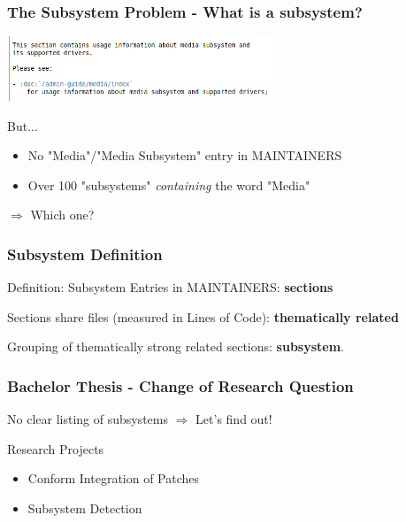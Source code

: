 \documentclass{beamer}
\begin{document}
	\begin{frame}
	\frametitle{The Subsystem Problem - What is a subsystem?}
     	\includegraphics[width=0.6\textwidth]{pics/Media_subsystem.png}

	\begin{block}{But... }
		\begin{itemize}
		\item No "Media"/"Media Subsystem" entry in MAINTAINERS
		\item Over 100 "subsystems" \textit{containing} the word "Media"
		\end{itemize}
	\end{block}
	$\Rightarrow$ Which one?
	\end{frame}

	\begin{frame} %
	\frametitle{Subsystem Definition}
		\begin{block}{Definition: Subsystem}
			Entries in MAINTAINERS: \textbf{sections}

			Sections share files (measured in Lines of Code): \textbf{thematically related}

			Grouping of thematically strong related sections: \textbf{subsystem}.

		\end{block}
	\end{frame}

	\begin{frame}
	\frametitle{Bachelor Thesis - Change of Research Question}
		\begin{block}{No clear listing of subsystems}
			$\Rightarrow$ Let's find out!
		\end{block}

		\begin{block}{Research Projects}
			\begin{itemize}
				\item Conform Integration of Patches
				\item Subsystem Detection
			\end{itemize}
		\end{block}
	\end{frame}
\end{document}
